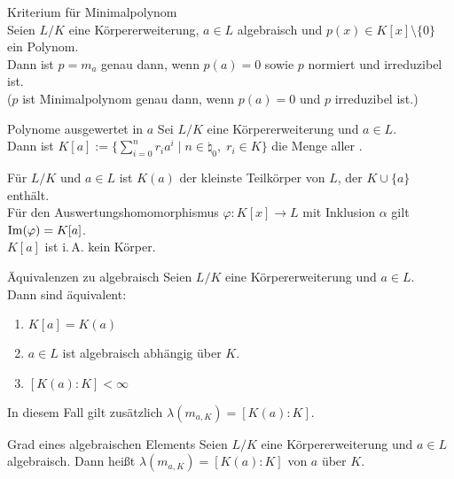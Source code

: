 \begin{Lemma}{Kriterium für Minimalpolynom}\\
    Seien $L/K$ eine Körpererweiterung, $a \in L$ algebraisch
    und $p(x) \in K[x] \setminus \{0\}$ ein Polynom.\\
    Dann ist $p = m_a$ genau dann, wenn
    $p(a) = 0$ sowie $p$ normiert und irreduzibel ist.\\
    ($p$ ist Minimalpolynom genau dann,
    wenn $p(a) = 0$ und $p$ irreduzibel ist.)
\end{Lemma}

\linie

\begin{Def}{Polynome ausgewertet in $a$}
    Sei $L/K$ eine Körpererweiterung und $a \in L$.\\
    Dann ist $K[a] := \{\sum_{i=0}^n r_i a^i \;|\;
    n \in \natural_0,\; r_i \in K\}$ die Menge aller
    .
\end{Def}

\begin{Bem}
    Für $L/K$ und $a \in L$ ist $K(a)$ der kleinste Teilkörper von $L$, der
    $K \cup \{a\}$ enthält.\\
    Für den Auswertungshomomorphismus $\varphi\colon K[x] \rightarrow L$
    mit Inklusion $\alpha$ gilt $\operatorname{Im}(\varphi) = K[a]$.\\
    $K[a]$ ist i.\,A. kein Körper.
\end{Bem}

\begin{Prop}{Äquivalenzen zu algebraisch}
    Seien $L/K$ eine Körpererweiterung und $a \in L$.\\
    Dann sind äquivalent:
    \begin{enumerate}[label=(\alph*)]
        \item
        $K[a] = K(a)$
        
        \item
        $a \in L$ ist algebraisch abhängig über $K$.
        
        \item
        $[K(a) : K] < \infty$
    \end{enumerate}
    In diesem Fall gilt zusätzlich $\lambda(m_{a,K}) = [K(a) : K]$.
\end{Prop}

\begin{Def}{Grad eines algebraischen Elements}
    Seien $L/K$ eine Körpererweiterung und $a \in L$ algebraisch.
    Dann heißt $\lambda(m_{a,K}) = [K(a) : K]$  von $a$ über $K$.
\end{Def}

